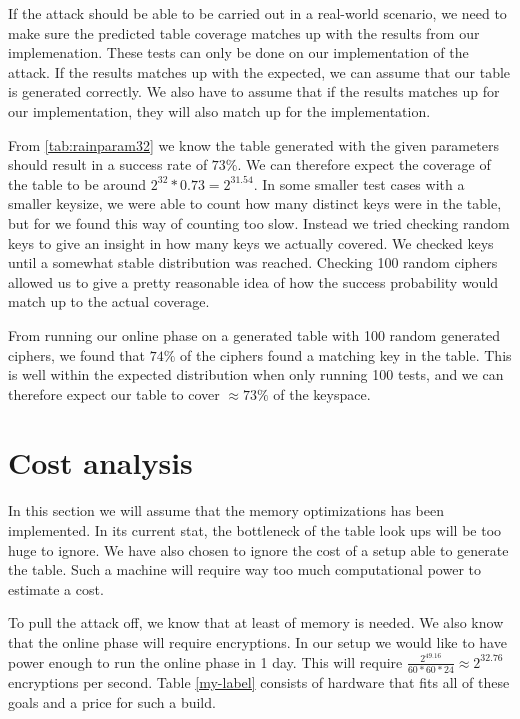 If the attack should be able to be carried out in a real-world
scenario, we need to make sure the predicted table coverage matches up
with the results from our implemenation. These tests can only be done
on our  implementation of the attack. If the results
matches up with the expected, we can assume that our table is
generated correctly. We also have to assume that if the results
matches up for our  implementation, they will also match
up for the  implementation.

From \ref{tab:rainparam32} we know the table generated with the given
parameters should result in a success rate of $73\%$. We can therefore
expect the coverage of the table to be around $2^{32} * 0.73 =
2^{31.54}$. In some smaller test cases with a smaller keysize, we were
able to count how many distinct keys were in the table, but for
 we found this way of counting too slow. Instead we tried
checking random keys to give an insight in how many keys we
actually covered. We checked keys until a somewhat stable distribution was
reached. Checking 100 random ciphers allowed us to give a pretty
reasonable idea of how the success probability would match up to the
actual coverage.

From running our online phase on a generated table with 100 random
generated ciphers, we found that $74\%$ of the ciphers found a
matching key in the table. This is well within the expected
distribution when only running 100 tests, and we can therefore expect
our table to cover $\approx73\%$ of the keyspace.




\section{Cost analysis}
In this section we will assume that the memory optimizations has been
implemented. In its current stat, the bottleneck of the table look ups
will be too huge to ignore. We have also chosen to ignore the cost of
a setup able to generate the table. Such a machine will require way
too much computational power to estimate a cost. 

To pull the attack off, we know that at least  of memory
is needed. We also know that the online phase will require  
encryptions. In our setup we would like to have power enough to run
the online phase in 1 day. This will require
$\frac{2^{49.16}}{60*60*24}\approx 2^{32.76}$ encryptions per
second. Table \ref{my-label} consists of hardware that fits all of
these goals and a price for such a build.

